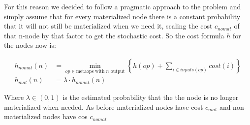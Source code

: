 For this reason we decided to follow a pragmatic approach to the
problem and simply assume that for every materialized node there is a
constant probability that it will not still be materialized when we
need it, scaling the cost \(c_{nomat}\) of that n-node by that factor
to get the stochastic cost. So the cost formula \(h\) for the nodes
now is:

\begin{align*}
  h_{nomat}(n) &= \min\limits_{op \in \text{metaops with \(n\) output}} \left\{ h(op) + \sum\limits_{i \in inputs(op)} cost(i)  \right\} \\
  h_{mat}(n) &= \lambda \cdot h_{nomat}(n)
\end{align*}

Where \(\lambda \in (0,1)\) is the estimated probability that the the
node is no longer materialized when needed. As before materialized
nodes have cost \(c_{mat}\) and non-materialized nodes have cos
\(c_{nomat}\)
